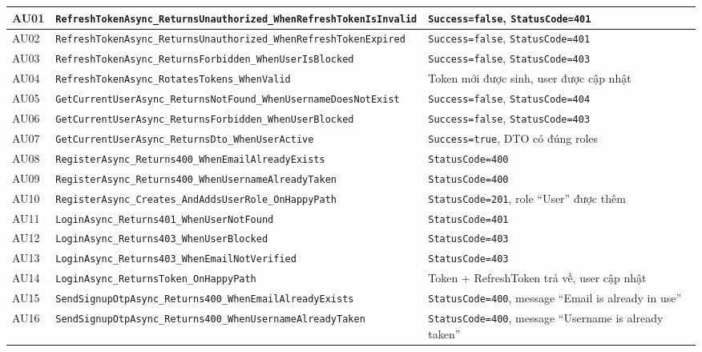 \documentclass[a4paper]{article}
\begin{document}
\begin{longtable}{|C{0.8cm}|L{5.4cm}|L{7.4cm}|}
AU01 & \texttt{RefreshTokenAsync\_ReturnsUnauthorized\_WhenRefreshTokenIsInvalid} & \texttt{Success=false}, \texttt{StatusCode=401} \\
\hline
AU02 & \texttt{RefreshTokenAsync\_ReturnsUnauthorized\_WhenRefreshTokenExpired} & \texttt{Success=false}, \texttt{StatusCode=401} \\
\hline
{}
AU03 & \texttt{RefreshTokenAsync\_ReturnsForbidden\_WhenUserIsBlocked} & \texttt{Success=false}, \texttt{StatusCode=403} \\
\hline
AU04 & \texttt{RefreshTokenAsync\_RotatesTokens\_WhenValid} & Token mới được sinh, user được cập nhật \\
\hline
{}
AU05 & \texttt{GetCurrentUserAsync\_ReturnsNotFound\_WhenUsernameDoesNotExist} & \texttt{Success=false}, \texttt{StatusCode=404} \\
\hline
AU06 & \texttt{GetCurrentUserAsync\_ReturnsForbidden\_WhenUserBlocked} & \texttt{Success=false}, \texttt{StatusCode=403} \\
\hline
{}
AU07 & \texttt{GetCurrentUserAsync\_ReturnsDto\_WhenUserActive} & \texttt{Success=true}, DTO có đúng roles \\
\hline
AU08 & \texttt{RegisterAsync\_Returns400\_WhenEmailAlreadyExists} & \texttt{StatusCode=400} \\
\hline
{}
AU09 & \texttt{RegisterAsync\_Returns400\_WhenUsernameAlreadyTaken} & \texttt{StatusCode=400} \\
\hline
AU10 & \texttt{RegisterAsync\_Creates\_AndAddsUserRole\_OnHappyPath} & \texttt{StatusCode=201}, role ``User'' được thêm \\
\hline
{}
AU11 & \texttt{LoginAsync\_Returns401\_WhenUserNotFound} & \texttt{StatusCode=401} \\
\hline
AU12 & \texttt{LoginAsync\_Returns403\_WhenUserBlocked} & \texttt{StatusCode=403} \\
\hline
{}
AU13 & \texttt{LoginAsync\_Returns403\_WhenEmailNotVerified} & \texttt{StatusCode=403} \\
\hline
AU14 & \texttt{LoginAsync\_ReturnsToken\_OnHappyPath} & Token + RefreshToken trả về, user cập nhật \\
\hline
{}
AU15 & \texttt{SendSignupOtpAsync\_Returns400\_WhenEmailAlreadyExists} & \texttt{StatusCode=400}, message ``Email is already in use'' \\
\hline
AU16 & \texttt{SendSignupOtpAsync\_Returns400\_WhenUsernameAlreadyTaken} & \texttt{StatusCode=400}, message ``Username is already taken'' \\

\end{longtable}
\end{document}
